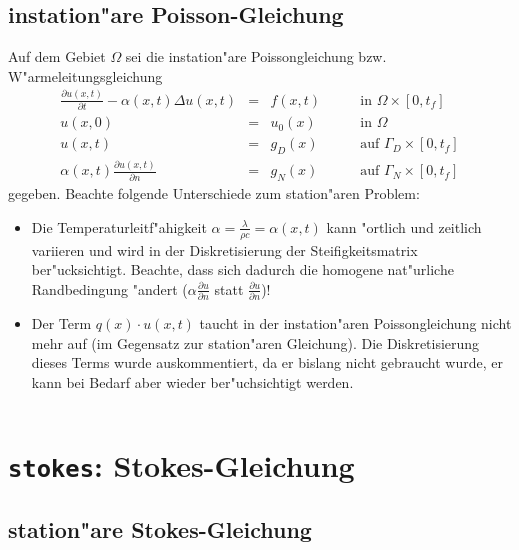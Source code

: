 \documentclass[11pt,a4paper]{article}
\newenvironment{Code}{\begin{quote}\scriptsize}{\end{quote}}
\begin{document}
\subsection{instation"are Poisson-Gleichung}
Auf dem Gebiet $\Omega$ sei die instation"are Poissongleichung bzw.
W"armeleitungsgleichung
\[
\begin{array}{rcll}
    \frac{\partial u(x,t)}{\partial t} - \alpha(x,t)\Delta u(x,t) &=& f(x,t) 
    & \qquad\mbox{in }\Omega\times[0,t_f]\\
    u(x,0) &=& u_0(x) & \qquad\mbox{in }\Omega\\
    u(x,t) &=& g_D(x) & \qquad\mbox{auf }\Gamma_D\times[0,t_f]\\
    \alpha(x,t)\frac{\partial u(x,t)}{\partial n} &=& g_N(x) 
    & \qquad\mbox{auf }\Gamma_N\times[0,t_f]
\end{array}
\]
gegeben. Beachte folgende Unterschiede zum station"aren Problem:
\begin{itemize}
  \item Die Temperaturleitf"ahigkeit $\alpha=\frac{\lambda}{\rho c}=\alpha(x,t)$ kann "ortlich und zeitlich variieren und wird in der Diskretisierung der Steifigkeitsmatrix ber"ucksichtigt. Beachte, dass sich dadurch die homogene nat"urliche Randbedingung "andert ($\alpha\frac{\partial u}{\partial n}$ statt $\frac{\partial u}{\partial n}$)!
  \item Der Term $q(x)\cdot u(x,t)$ taucht in der instation"aren Poissongleichung nicht mehr auf (im Gegensatz zur station"aren Gleichung). Die Diskretisierung dieses Terms wurde auskommentiert, da er bislang nicht gebraucht wurde, er kann bei Bedarf aber wieder ber"uchsichtigt werden.
\end{itemize}

\begin{Code}
\begin{verbatim}
\end{verbatim}
\end{Code}

\section{{\tt stokes}: Stokes-Gleichung}

\subsection{station"are Stokes-Gleichung}
\begin{Code}
\begin{verbatim}
\end{verbatim}
\end{Code}
\end{document}

